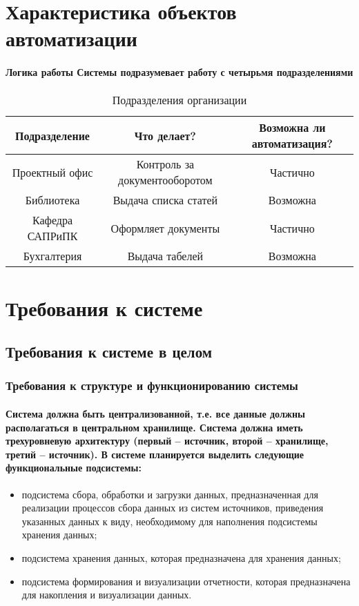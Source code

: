 \documentclass{article}
\begin{document}
\section{Характеристика объектов автоматизации}
    \paragraph{Логика работы Системы подразумевает работу с четырьмя подразделениями}

\begin{table}[h!]
  \caption{Подразделения организации}
  \begin{tabular}{c|c|c}
    \textbf{Подразделение} & \textbf{Что делает?} & \textbf{Возможна ли автоматизация?} \\ %
    \hline %
     Проектный офис & Контроль за документооборотом & Частично \\
    \hline
        Библиотека & Выдача списка статей & Возможна \\
    \hline
        Кафедра САПРиПК & Оформляет документы & Частично \\
    \hline
        Бухгалтерия & Выдача табелей & Возможна \\
  \end{tabular}
\end{table}
    
    
\section{Требования к системе}
    \subsection{Требования к системе в целом}
        \subsubsection{Требования к структуре и функционированию системы}
            \paragraph{Система должна быть централизованной, т.е. все данные должны располагаться в центральном хранилище. Система должна иметь трехуровневую архитектуру (первый – источник, второй – хранилище, третий – источник). В системе планируется выделить следующие функциональные подсистемы:}
            
        \begin{itemize}
            \item подсистема сбора, обработки и загрузки данных, предназначенная для реализации процессов сбора данных из систем источников, приведения указанных данных к виду, необходимому для наполнения подсистемы хранения данных;
            \item подсистема хранения данных, которая предназначена для хранения данных;
            \item подсистема формирования и визуализации отчетности, которая предназначена для накопления и визуализации данных.
        \end{itemize}
        
\end{document}
